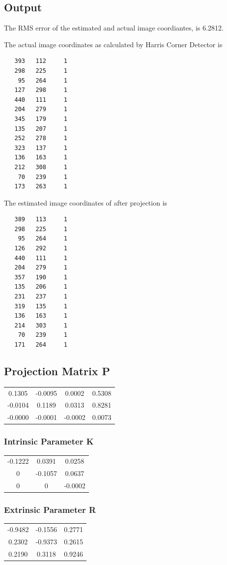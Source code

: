 \documentclass[12pt]{article}
\begin{document}
\subsection{Output}
The RMS error of the estimated and actual image coordiantes, is  6.2812.

The actual image coordinates as calculated by Harris Corner Detector is 
\begin{lstlisting}
   393   112     1
   298   225     1
    95   264     1
   127   298     1
   440   111     1
   204   279     1
   345   179     1
   135   207     1
   252   278     1
   323   137     1
   136   163     1
   212   308     1
    70   239     1
   173   263     1

   \end{lstlisting}
   
The estimated image coordinates of after projection is
\begin{lstlisting} 
   389   113     1
   298   225     1
    95   264     1
   126   292     1
   440   111     1
   204   279     1
   357   190     1
   135   206     1
   231   237     1
   319   135     1
   136   163     1
   214   303     1
    70   239     1
   171   264     1
   \end{lstlisting}

\subsection{Projection Matrix P}
\begin{tabular}{|c|c|c|c|}
\hline
    0.1305  & -0.0095 &   0.0002  &  0.5308 \\
   -0.0104  &  0.1189 &   0.0313  &  0.8281 \\
   -0.0000  & -0.0001 &  -0.0002 &   0.0073 \\
    \hline
\end{tabular}

\subsubsection{Intrinsic Parameter K}
\begin{tabular}{|c|c|c|}
\hline
    -0.1222 &  0.0391   & 0.0258 \\
         0  & -0.1057  &  0.0637 \\
         0   &      0 &  -0.0002\\
\hline
\end{tabular}

\subsubsection{Extrinsic Parameter R}
\begin{tabular}{|c|c|c|}
\hline
   -0.9482 &  -0.1556 &   0.2771 \\
    0.2302 &  -0.9373  &  0.2615 \\
    0.2190 &  0.3118  &  0.9246\\
\hline
\end{tabular}
\end{document}
